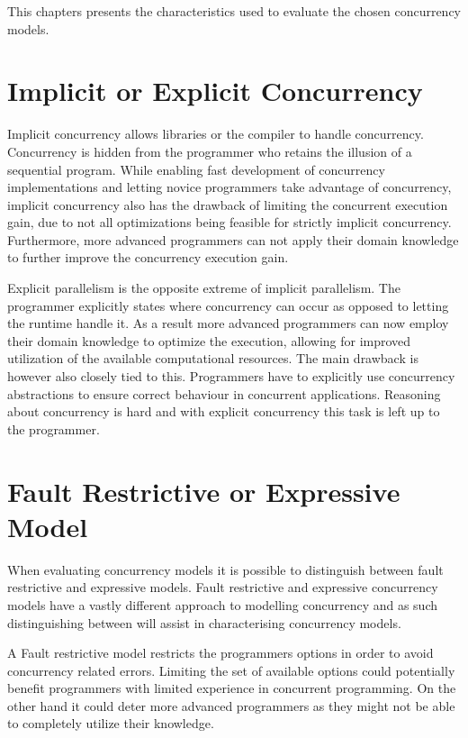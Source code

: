  \makeatletter {}\makeatother
{}
This chapters presents the characteristics used to evaluate the chosen concurrency models.
\label{chap:char}
\section{Implicit or Explicit Concurrency}
Implicit concurrency allows libraries or the compiler to handle concurrency. Concurrency is hidden from the programmer who retains the illusion of a sequential program\cite[p. 59]{sutter2005software}. While enabling fast development of concurrency implementations and letting novice programmers take advantage of concurrency, implicit concurrency also has the drawback of limiting the concurrent execution gain, due to not all optimizations being feasible for strictly implicit concurrency. Furthermore, more advanced programmers can not apply their domain knowledge to further improve the concurrency execution gain.

Explicit parallelism is the opposite extreme of implicit parallelism. The programmer explicitly states where concurrency can occur as opposed to letting the runtime handle it\cite[p. 59]{sutter2005software}. As a result more advanced programmers can now employ their domain knowledge to optimize the execution, allowing for improved utilization of the available computational resources. The main drawback is however also closely tied to this. Programmers have to explicitly use concurrency abstractions to ensure correct behaviour in concurrent applications. Reasoning about concurrency is hard\cite[p. 56]{sutter2005software} and with explicit concurrency this task is left up to the programmer.

\section{Fault Restrictive or Expressive Model}
When evaluating concurrency models it is possible to distinguish between fault restrictive and expressive models. Fault restrictive and expressive concurrency models have a vastly different approach to modelling concurrency and as such distinguishing between will assist in characterising concurrency models. 

A Fault restrictive model restricts the programmers options in order to avoid concurrency related errors. Limiting the set of available options could potentially benefit programmers with limited experience in concurrent programming. On the other hand it could deter more advanced programmers as they might not be able to completely utilize their knowledge.

